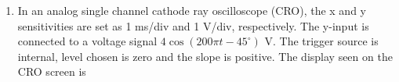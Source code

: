 \documentclass[journal,12pt,onecolumn]{IEEEtran}
\theoremstyle{remark}
\begin{document}
\begin{enumerate}
\item In an analog single channel cathode ray oscilloscope (CRO), the x and y sensitivities are set as 1 ms/div and 1 V/div, respectively. The y-input is connected to a voltage signal $4 \cos(200\pi t - 45^\circ)$ V. The trigger source is internal, level chosen is zero and the slope is positive. The display seen on the CRO screen is
\begin{enumerate}
\begin{figure}[H]
\centering
{}
\end{figure}
\end{enumerate}
\end{enumerate}
\end{document}
